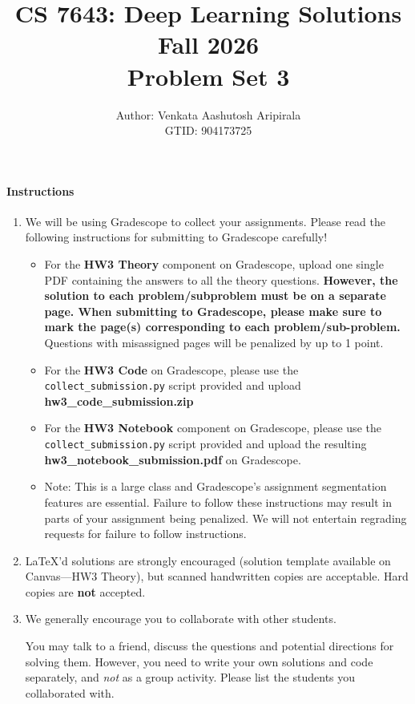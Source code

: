 \documentclass[11pt,english]{article}
\begin{document}
\title{CS 7643: Deep Learning Solutions\\
Fall 2026 \\
Problem Set 3}

\author{Author: Venkata Aashutosh Aripirala \\
GTID: 904173725}
\maketitle


\paragraph*{Instructions}
\begin{enumerate}
\item We will be using Gradescope to collect your assignments.  Please read the following instructions for submitting to Gradescope carefully!
     \begin{itemize}
         \item
               For the \textbf{HW3 Theory} component on Gradescope, upload one single PDF containing the answers to all the theory questions. \textbf{However, the solution to each problem/subproblem must be on a separate page. When submitting to Gradescope, please make sure to mark the page(s) corresponding to each problem/sub-problem.} Questions with misassigned pages will be penalized by up to 1 point.
          \item
               For the \textbf{HW3 Code} on Gradescope, please use the \texttt{collect\_submission.py} script provided and upload \textbf{hw3\_code\_submission.zip}
          \item
               For the \textbf{HW3 Notebook} component on Gradescope, please use the \texttt{collect\_submission.py} script provided and upload the resulting \textbf{hw3\_notebook\_submission.pdf} on Gradescope.
          \item
               Note: This is a large class and Gradescope's assignment segmentation features are essential.
               Failure to follow these instructions may result in parts of your assignment being penalized.
               We will not entertain regrading requests for failure to follow instructions.
     \end{itemize}

\item
    \LaTeX'd  solutions are strongly encouraged (solution template
     available on Canvas---HW3 Theory),
     but scanned handwritten copies are acceptable.
     Hard copies are \textbf{not} accepted.


\item We generally encourage you to collaborate with other students.

You may talk to a friend,
discuss the questions and potential directions for solving them. However, you need to write
your own solutions and code separately, and \emph{not} as a group activity.
Please list the students you collaborated with. \\ \\

\end{enumerate}
\end{document}
